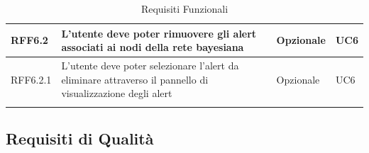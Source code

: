 \begin{center}
\begin{longtable}[c]{|m{}|m{}|m{}|m{}|}
\hline
RFF6.2 & L'utente deve poter rimuovere gli alert associati ai nodi della rete bayesiana & Opzionale & UC6\\
\hline
\rowcolor{grigio}RFF6.2.1 & L'utente deve poter selezionare l'alert da eliminare attraverso il pannello di visualizzazione degli alert & Opzionale & UC6\\
\hline
\caption{Requisiti Funzionali}
\end{longtable}
\end{center}



\subsection{Requisiti di Qualità}\label{RQ}
